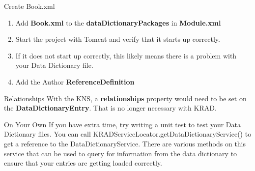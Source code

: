 \documentclass[xcolor=dvipsnames,14pt,professionalfonts]{beamer}
\begin{document}
\begin{frame}{Create Book.xml}
  \begin{enumerate}
  \item Add \textbf{Book.xml} to the \textbf{dataDictionaryPackages} in \textbf{Module.xml}
  \item Start the project with Tomcat and verify that it starts up correctly.
  \item If it does not start up correctly, this likely means there is a problem with your Data Dictionary file.
  \item Add the Author \textbf{ReferenceDefinition}
    \end{enumerate}
  \end{frame}

\begin{frame}[fragile]{Relationships}
  With the KNS, a \textbf{relationships} property would need to be set
  on the \textbf{DataDictionaryEntry}. That is no longer necessary
  with KRAD.
\end{frame}


\begin{frame}{On Your Own}
If you have extra time, try writing a unit test to test your Data Dictionary files.
You can call KRADServiceLocator.getDataDictionaryService() to get a reference to the DataDictionaryService.  There are various methods on this service that can be used to query for information from the data dictionary to ensure that your entries are getting loaded correctly.
\end{frame}
\end{document}
